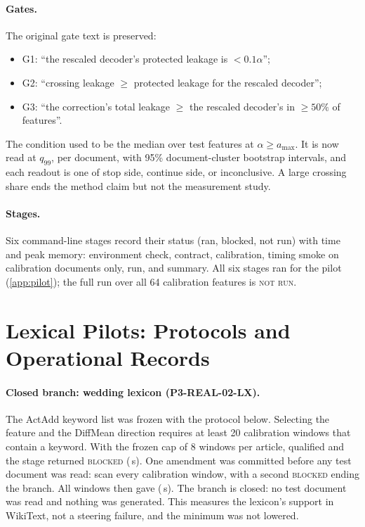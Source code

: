\documentclass{article}
\theoremstyle{plain}
\theoremstyle{definition}
\theoremstyle{remark}
\newcommand{\notrun}{\textsc{not run}}
\begin{document}
\paragraph{Gates.}
The original gate text is preserved:
\begin{itemize}
  \item G1: ``the rescaled decoder's protected leakage is $<0.1\alpha$'';
  \item G2: ``crossing leakage $\ge$ protected leakage for the rescaled decoder'';
  \item G3: ``the correction's total leakage $\ge$ the rescaled decoder's in $\ge 50\%$ of
  features''.
\end{itemize}
The condition used to be the median over test features at $\alpha\ge a_{\max}$. It is now
read at $q_{99}$, per document, with 95\% document-cluster bootstrap intervals, and each
readout is one of stop side, continue side, or inconclusive. A large crossing share ends
the method claim but not the measurement study.

\paragraph{Stages.}
Six command-line stages record their status (ran, blocked, not run) with time and peak
memory: environment check, contract, calibration, timing smoke on calibration documents
only, run, and summary. All six stages ran for the pilot (\cref{app:pilot}); the full run over all 64
calibration features is \notrun.

\section{Lexical Pilots: Protocols and Operational Records}
\label{app:real02}
\begin{table}[h]
  \caption{Space-lexicon pilot, paired per article (mean differences with 95\% document-bootstrap
  intervals; only the first row is confirmatory). ``$a$ only / $b$ only'': discordant articles
  for the primary pair.}
  \label{tab:space-paired}
  \centering
  \small
  
\end{table}

\paragraph{Closed branch: wedding lexicon (P3-REAL-02-LX).} The ActAdd keyword list
\citep{turner2024steering} was frozen with the protocol below. Selecting the feature and the
DiffMean direction requires at least 20 calibration windows that contain a keyword. With the
frozen cap of 8 windows per article, \LxHitsVOne{} qualified and the stage returned
\textsc{blocked} (\LxCalSecVOne\,s). One amendment was committed before any test document was
read: scan every calibration window, with a second \textsc{blocked} ending the branch. All
\LxWindowsAll{} windows then gave \LxHitsVOneOne{} (\LxCalSecVOneOne\,s). The branch is
closed: no test document was read and nothing was generated. This measures the lexicon's
support in WikiText, not a steering failure, and the minimum was not lowered.
\end{document}
